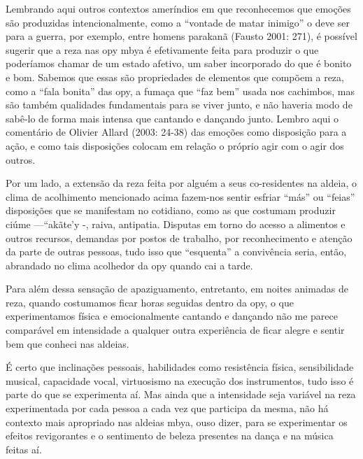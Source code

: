 \documentclass{article}
\begin{document}
Lembrando aqui outros contextos amer\'indios em que reconhecemos que
emo\c{c}\~oes s\~ao produzidas intencionalmente, como a
{\textquotedblleft}vontade de matar inimigo{\textquotedblright} o deve
ser para a guerra, por exemplo, entre homens parakan\~a (Fausto 2001:
271), \'e poss\'ivel sugerir que a reza nas opy mbya \'e efetivamente
feita para produzir o que poder\'iamos chamar de um estado afetivo, um
saber incorporado do que \'e bonito e bom. Sabemos que essas s\~ao
propriedades de elementos que comp\~oem a reza, como a
{\textquotedblleft}fala bonita{\textquotedblright} das opy, a
fuma\c{c}a que {\textquotedblleft}faz bem{\textquotedblright} usada nos
cachimbos, mas s\~ao tamb\'em qualidades fundamentais para se viver
junto, e n\~ao haveria modo de sab\^e-lo de forma mais intensa que
cantando e dan\c{c}ando junto. Lembro aqui o coment\'ario de Olivier
Allard (2003: 24-38) das emo\c{c}\~oes como disposi\c{c}\~ao para a
a\c{c}\~ao, e como tais disposi\c{c}\~oes colocam em rela\c{c}\~ao o
pr\'oprio agir com o agir dos outros.

Por um lado, a extens\~ao da reza feita por algu\'em a seus
co-residentes na aldeia, o clima de acolhimento mencionado acima
fazem-nos sentir esfriar {\textquotedblleft}m\'as{\textquotedblright}
ou {\textquotedblleft}feias{\textquotedblright} disposi\c{c}\~oes que
se manifestam no cotidiano, como as que costumam produzir ci\'ume
---{\textquotedblleft}ak\~ate{\textquoteright}y {}-,  raiva, antipatia.
Disputas em torno do acesso a alimentos e outros recursos, demandas por
postos de trabalho, por reconhecimento e aten\c{c}\~ao da parte de
outras pessoas, tudo isso que
{\textquotedblleft}esquenta{\textquotedblright} a conviv\^encia seria,
ent\~ao, abrandado no clima acolhedor da opy quando cai a tarde.

Para al\'em dessa sensa\c{c}\~ao de apaziguamento, entretanto, em noites
animadas de reza, quando costumamos ficar horas seguidas dentro da opy,
o que experimentamos f\'isica e emocionalmente cantando e dan\c{c}ando
n\~ao me parece compar\'avel em intensidade a qualquer outra
experi\^encia de ficar alegre e sentir bem que conheci nas aldeias.

\'E certo que inclina\c{c}\~oes pessoais, habilidades como resist\^encia
f\'isica, sensibilidade musical, capacidade vocal, virtuosismo na
execu\c{c}\~ao dos instrumentos, tudo isso \'e parte do que se
experimenta a\'i. Mas ainda que a intensidade seja vari\'avel na reza
experimentada por cada pessoa a cada vez que participa da mesma, n\~ao
h\'a contexto mais apropriado nas aldeias mbya, ouso dizer, para se
experimentar os efeitos revigorantes e o sentimento de beleza presentes
na dan\c{c}a e na m\'usica feitas a\'i.
\end{document}
